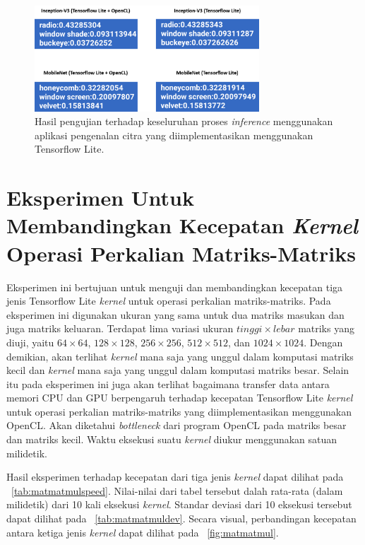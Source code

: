 \begin{figure}
	\centering
	\includegraphics[width=0.75\textwidth]
	{pics/correct.png}
	\caption{Hasil pengujian terhadap keseluruhan proses \textit{inference} menggunakan aplikasi pengenalan citra yang diimplementasikan menggunakan Tensorflow Lite.}
	\label{fig:correct}
\end{figure}

\section{Eksperimen Untuk Membandingkan Kecepatan \textit{Kernel} Operasi Perkalian Matriks-Matriks }
Eksperimen ini bertujuan untuk menguji dan membandingkan kecepatan tiga jenis Tensorflow Lite \textit{kernel} untuk operasi perkalian matriks-matriks. Pada eksperimen ini digunakan ukuran yang sama untuk dua matriks masukan dan juga matriks keluaran. Terdapat lima variasi ukuran $tinggi \times lebar$ matriks yang diuji, yaitu $64 \times 64$, $128 \times 128$, $256 \times 256$, $512 \times 512$, dan $1024 \times 1024$. Dengan demikian, akan terlihat \textit{kernel} mana saja yang unggul dalam komputasi matriks kecil dan \textit{kernel} mana saja yang unggul dalam komputasi matriks besar. Selain itu pada eksperimen ini juga akan terlihat bagaimana transfer data antara memori CPU dan GPU berpengaruh terhadap kecepatan Tensorflow Lite \textit{kernel} untuk operasi perkalian matriks-matriks yang diimplementasikan menggunakan OpenCL. Akan diketahui \textit{bottleneck} dari program OpenCL pada matriks besar dan matriks kecil. Waktu eksekusi suatu \textit{kernel} diukur menggunakan satuan milidetik.

Hasil eksperimen terhadap kecepatan dari tiga jenis \textit{kernel} dapat dilihat pada \tab~\ref{tab:matmatmulspeed}. Nilai-nilai dari tabel tersebut dalah rata-rata (dalam milidetik) dari 10 kali eksekusi \textit{kernel}. Standar deviasi dari 10 eksekusi tersebut dapat dilihat pada \tab~\ref{tab:matmatmuldev}. Secara visual, perbandingan kecepatan antara ketiga jenis \textit{kernel} dapat dilihat pada \pic~\ref{fig:matmatmul}. 

